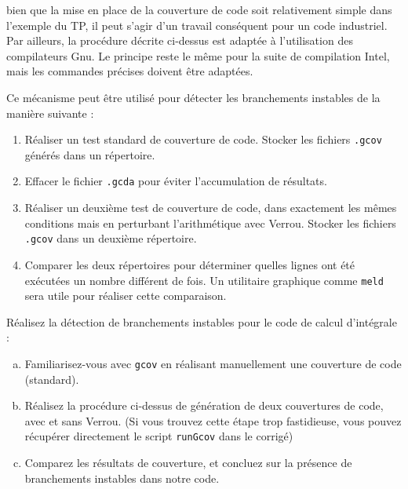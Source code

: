 \documentclass[a4paper]{article}
\newcounter{Question}
\newenvironment{question}[1][\unskip]{
  \bigskip
  \stepcounter{Question}
  \def\questionTitle{ #1}
  \begin{mdframed}[style=question]
  }{
  \end{mdframed}
}
\newenvironment{info}[1][NB :]{
  \begin{mdframed}[style=info]
    \noindent{\bf #1}
}{
  \end{mdframed}
}
\begin{document}
\medskip

\begin{info}
  bien que la mise en place de la couverture de code soit relativement simple
  dans l'exemple du TP, il peut s'agir d'un travail conséquent pour un code
  industriel.  Par ailleurs, la procédure décrite ci-dessus est adaptée à
  l'utilisation des compilateurs Gnu. Le principe reste le même pour la suite de
  compilation Intel, mais les commandes précises doivent être adaptées.
\end{info}

\bigskip

\noindent Ce mécanisme peut être utilisé pour détecter les branchements instables de la
manière suivante :
\begin{enumerate}
\item Réaliser un test standard de couverture de code. Stocker les fichiers
  \texttt{.gcov} générés dans un répertoire.
\item Effacer le fichier \texttt{.gcda} pour éviter l'accumulation de résultats.
\item Réaliser un deuxième test de couverture de code, dans exactement les mêmes
  conditions mais en perturbant l'arithmétique avec Verrou. Stocker les fichiers
  \texttt{.gcov} dans un deuxième répertoire.
\item Comparer les deux répertoires pour déterminer quelles lignes ont été
  exécutées un nombre différent de fois. Un utilitaire graphique comme
  \texttt{meld} sera utile pour réaliser cette comparaison.
\end{enumerate}

\begin{question}
  Réalisez la détection de branchements instables pour le code de
  calcul d'intégrale :
  \begin{enumerate}[(a)]
  \item Familiarisez-vous avec \texttt{gcov} en réalisant manuellement une
    couverture de code (standard).
  \item Réalisez la procédure ci-dessus de génération de deux couvertures de
    code, avec et sans Verrou. (Si vous trouvez cette étape trop fastidieuse,
    vous pouvez récupérer directement le script \texttt{runGcov} dans le
    corrigé)
  \item Comparez les résultats de couverture, et concluez sur la présence de
    branchements instables dans notre code.
  \end{enumerate}
\end{question}
\end{document}
